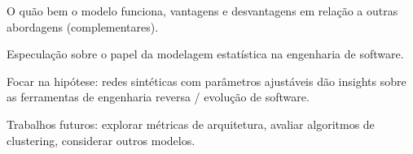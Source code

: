 \documentclass{acm_proc_article-sp}
\begin{document}




O quão bem o modelo funciona, vantagens e desvantagens em relação a outras abordagens (complementares).

Especulação sobre o papel da modelagem estatística na engenharia de software.

Focar na hipótese: redes sintéticas com parâmetros ajustáveis dão insights sobre as ferramentas de engenharia reversa / evolução de software.




Trabalhos futuros: explorar métricas de arquitetura, avaliar algoritmos de clustering, considerar outros modelos.

%


\end{document}
